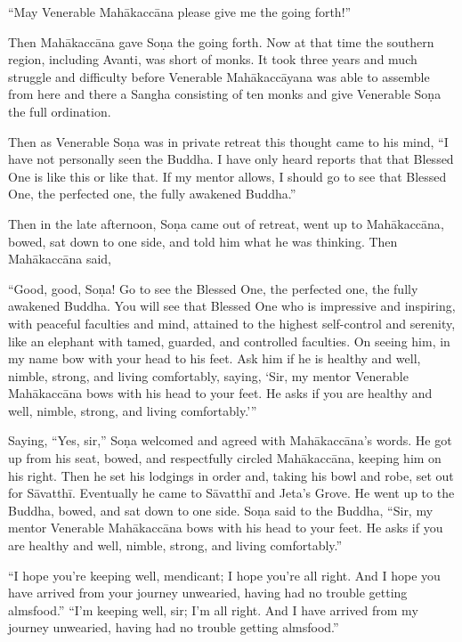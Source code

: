 \documentclass[12pt,openany]{book}%
\begin{document}
“May Venerable \textsanskrit{Mahākaccāna} please give me the going forth!” 

Then \textsanskrit{Mahākaccāna} gave \textsanskrit{Soṇa} the going forth. Now at that time the southern region, including Avanti, was short of monks. It took three years and much struggle and difficulty before Venerable \textsanskrit{Mahākaccāyana} was able to assemble from here and there a Sangha consisting of ten monks and give Venerable \textsanskrit{Soṇa} the full ordination. 

Then as Venerable \textsanskrit{Soṇa} was in private retreat this thought came to his mind, “I have not personally seen the Buddha. I have only heard reports that that Blessed One is like this or like that. If my mentor allows, I should go to see that Blessed One, the perfected one, the fully awakened Buddha.” 

Then in the late afternoon, \textsanskrit{Soṇa} came out of retreat, went up to \textsanskrit{Mahākaccāna}, bowed, sat down to one side, and told him what he was thinking. Then \textsanskrit{Mahākaccāna} said, 

“Good, good, \textsanskrit{Soṇa}! Go to see the Blessed One, the perfected one, the fully awakened Buddha. You will see that Blessed One who is impressive and inspiring, with peaceful faculties and mind, attained to the highest self-control and serenity, like an elephant with tamed, guarded, and controlled faculties. On seeing him, in my name bow with your head to his feet. Ask him if he is healthy and well, nimble, strong, and living comfortably, saying, ‘Sir, my mentor Venerable \textsanskrit{Mahākaccāna} bows with his head to your feet. He asks if you are healthy and well, nimble, strong, and living comfortably.’” 

Saying, “Yes, sir,” \textsanskrit{Soṇa} welcomed and agreed with \textsanskrit{Mahākaccāna}’s words. He got up from his seat, bowed, and respectfully circled \textsanskrit{Mahākaccāna}, keeping him on his right. Then he set his lodgings in order and, taking his bowl and robe, set out for \textsanskrit{Sāvatthī}. Eventually he came to \textsanskrit{Sāvatthī} and Jeta’s Grove. He went up to the Buddha, bowed, and sat down to one side. \textsanskrit{Soṇa} said to the Buddha, “Sir, my mentor Venerable \textsanskrit{Mahākaccāna} bows with his head to your feet. He asks if you are healthy and well, nimble, strong, and living comfortably.” 

“I hope you’re keeping well, mendicant; I hope you’re all right. And I hope you have arrived from your journey unwearied, having had no trouble getting almsfood.” “I’m keeping well, sir; I’m all right. And I have arrived from my journey unwearied, having had no trouble getting almsfood.” 
\end{document}
